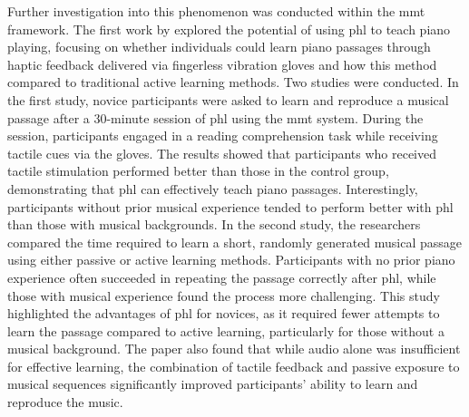 Further investigation into this phenomenon was conducted within the \gls{mmt} framework. The first work by \cite{Huang2010} explored the potential of using \gls{phl} to teach piano playing, focusing on whether individuals could learn piano passages through haptic feedback delivered via fingerless vibration gloves and how this method compared to traditional active learning methods.
Two studies were conducted. In the first study, novice participants were asked to learn and reproduce a musical passage after a 30-minute session of \gls{phl} using the \gls{mmt}  system. During the session, participants engaged in a reading comprehension task while receiving tactile cues via the gloves. The results showed that participants who received tactile stimulation performed better than those in the control group, demonstrating that \gls{phl} can effectively teach piano passages. Interestingly, participants without prior musical experience tended to perform better with \gls{phl} than those with musical backgrounds. In the second study, the researchers compared the time required to learn a short, randomly generated musical passage using either passive or active learning methods. Participants with no prior piano experience often succeeded in repeating the passage correctly after \gls{phl}, while those with musical experience found the process more challenging. This study highlighted the advantages of \gls{phl} for novices, as it required fewer attempts to learn the passage compared to active learning, particularly for those without a musical background.
The paper also found that while audio alone was insufficient for effective learning, the combination of tactile feedback and passive exposure to musical sequences significantly improved participants' ability to learn and reproduce the music.

